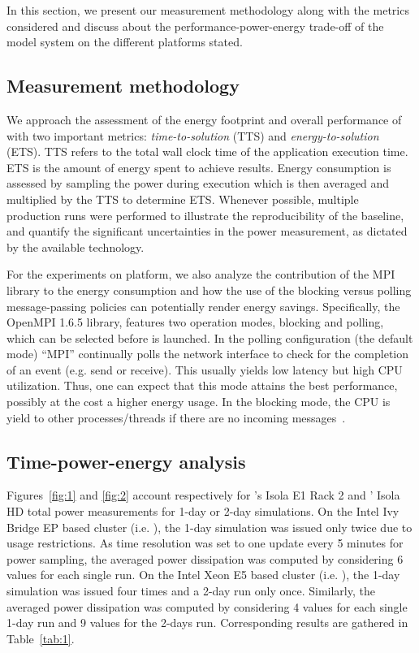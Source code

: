In this section, we present our measurement methodology along with the
metrics  considered  and  discuss about  the  performance-power-energy
trade-off of the model system on the different platforms stated.

\subsection{Measurement methodology}
\label{subsec:4.1}

We  approach  the  assessment  of  the energy  footprint  and  overall
performance    of    \cosmoart    with    two    important    metrics:
\textit{time-to-solution} (TTS) and \textit{energy-to-solution} (ETS).
TTS refers to  the total wall clock time  of the application execution
time. ETS  is the amount of  energy spent to  achieve results.  Energy
consumption is  assessed by sampling the power  during execution which
is then averaged and multiplied  by the TTS to determine ETS. Whenever
possible, multiple  production runs  were performed to  illustrate the
reproducibility  of   the  baseline,  and   quantify  the  significant
uncertainties in  the power measurement, as dictated  by the available
technology.

For  the   experiments  on  \tinto  platform,  we   also  analyze  the
contribution of the MPI library  to the energy consumption and how the
use  of  the  blocking  versus polling  message-passing  policies  can
potentially  render energy  savings. Specifically,  the  OpenMPI 1.6.5
library, features two operation modes, blocking and polling, which can
be selected before \cosmoart is launched. In the polling configuration
(the default mode) ``MPI''  continually polls the network interface to
check for  the completion  of an event  (e.g. send or  receive).  This
usually yields  low latency  but high CPU  utilization. Thus,  one can
expect that  this mode attains  the best performance, possibly  at the
cost a higher energy usage. In  the blocking mode, the CPU is yield to
other     processes/threads    if     there     are    no     incoming
messages~\cite{Castillo-2012}.

\subsection{Time-power-energy analysis}
\label{subsec:4.2}

Figures~\ref{fig:1} and \ref{fig:2}  account respectively for \monch's
Isola  E1 Rack 2  and \pilat'  Isola HD  total power  measurements for
1-day or 2-day  simulations. On the Intel Ivy  Bridge EP based cluster
(i.e.   \monch), the  1-day simulation  was issued  only twice  due to
usage restrictions. As  time resolution was set to  one update every 5
minutes  for  power  sampling,  the  averaged  power  dissipation  was
computed by  considering 6 values for  each single run.   On the Intel
Xeon E5 based cluster (i.e.   \pilat), the 1-day simulation was issued
four times and  a 2-day run only once.   Similarly, the averaged power
dissipation was computed by considering 4 values for each single 1-day
run  and  9 values  for  the  2-days  run. Corresponding  results  are
gathered in Table~\ref{tab:1}.

